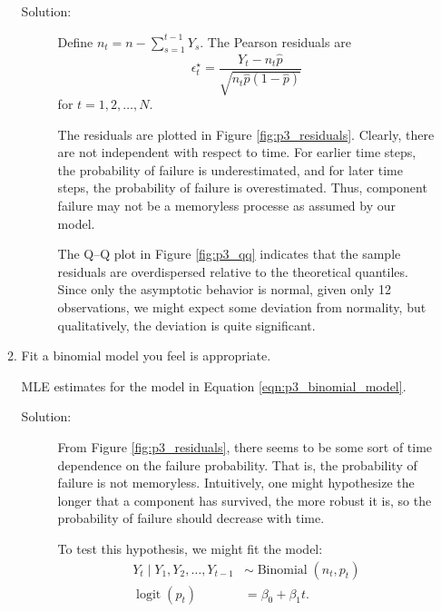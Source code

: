 \documentclass[letterpaper,11pt]{article}
\begin{document}
\begin{enumerate}
\begin{enumerate}
      \begin{description}        
      \item[Solution:] Define $n_t = n - \sum_{s=1}^{t-1} Y_s$. The Pearson
        residuals are
        \begin{equation}
          \epsilon_t^\star = \frac{Y_t - n_t\hat{p}}
          {\sqrt{n_t\hat{p}\left(1 - \hat{p}\right)}}
          \label{eqn:p3_pearson_residual}          
        \end{equation}
        for $t = 1,2,\ldots,N$.

        The residuals are plotted in Figure \ref{fig:p3_residuals}. Clearly,
        there are not independent with respect to time. For earlier time steps,
        the probability of failure is underestimated, and for later time steps,
        the probability of failure is overestimated. Thus, component failure may
        not be a memoryless processe as assumed by our model.

        The Q--Q plot in Figure \ref{fig:p3_qq} indicates that the sample
        residuals are overdispersed relative to the theoretical quantiles. Since
        only the asymptotic behavior is normal, given only 12 observations, we
        might expect some deviation from normality, but qualitatively, the
        deviation is quite significant.
      \end{description}
      \clearpage
    \item Fit a binomial model you feel is appropriate.
      \begin{table}
        \centering
        
        \caption{MLE estimates for the model in Equation
          \ref{eqn:p3_binomial_model}.}
        \label{tab:p3_model_summary}
      \end{table}
      
      \begin{description}
      \item[Solution:] From Figure \ref{fig:p3_residuals}, there seems to be
        some sort of time dependence on the failure probability. That is, the
        probability of failure is not memoryless. Intuitively, one might
        hypothesize the longer that a component has survived, the more robust
        it is, so the probability of failure should decrease with time.

        To test this hypothesis, we might fit the model:
        \begin{align}
          Y_t \mid Y_1,Y_2,\ldots, Y_{t-1}
          &\sim \operatorname{Binomial}\left(n_t, p_t\right)
          \label{eqn:p3_binomial_model} \\
          \operatorname{logit}\left(p_t\right)
          &= \beta_0 + \beta_1t. \nonumber
        \end{align}


\end{description}
\end{enumerate}
\end{enumerate}
\end{document}
